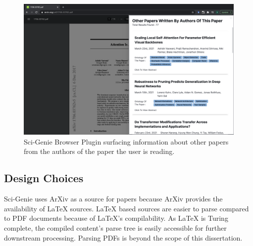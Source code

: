 \begin{figure}[h]
    \centering
    \includegraphics[width=\maxwidth{\textwidth}]{src/images/sci-genie-ext-authors-exp.png}
    \caption{ Sci-Genie Browser Plugin surfacing information about other papers from the authors of the paper the user is reading. }
    \label{figure\arabic{figurecounter}}
\end{figure}

\subsection{Design Choices}
Sci-Genie uses ArXiv as a source for papers because ArXiv provides the availability of LaTeX sources. LaTeX based sources are easier to parse compared to PDF documents because of LaTeX's compilability. As LaTeX is Turing complete, the compiled content’s parse tree is easily accessible for further downstream processing. Parsing PDFs is beyond the scope of this dissertation. 